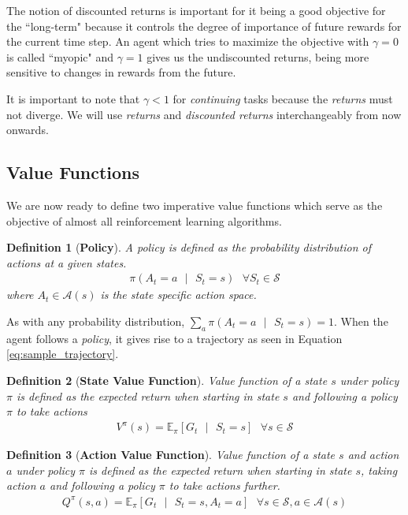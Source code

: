 \documentclass[12pt,a4paper]{article}
\newtheorem{definition}{Definition}
\begin{document}
The notion of discounted returns is important for it being a good objective for the ``long-term"
because it controls the degree of importance of future rewards for the current time step. An
agent which tries to maximize the objective with $\gamma = 0$ is called ``myopic" and
$\gamma = 1$ gives us the undiscounted returns, being more sensitive to changes in rewards
from the future.

It is important to note that $\gamma < 1$ for \textit{continuing} tasks because the \textit{returns}
must not diverge. We will use \textit{returns} and \textit{discounted returns} interchangeably
from now onwards.

\subsection{Value Functions}

We are now ready to define two imperative value functions which serve as the objective of 
almost all reinforcement learning algorithms.

\begin{definition}[\textbf{Policy}]
A policy is defined as the probability distribution of actions at a given states.
\begin{align}
\pi(A_t = a\text{ }|\text{ }S_t=s)\text{ }\forall S_t \in \mathcal{S}
\end{align}
where $A_t \in \mathcal{A}(s)$ is the state specific action space.
\end{definition}

As with any probability distribution, $\sum_{a} \pi(A_t = a\text{ }|\text{ }S_t=s) = 1$. When the
agent follows a \textit{policy}, it gives rise to a trajectory as seen in Equation 
\ref{eq:sample_trajectory}.

\begin{definition}[\textbf{State Value Function}]
Value function of a state $s$ under policy $\pi$ is defined as the expected return when starting
in state $s$ and following a policy $\pi$ to take actions
\begin{align}
V^\pi(s) = \mathbb{E}_\pi \left[ G_t\text{ }|\text{ }S_t=s \right]\text{ }\forall s \in \mathcal{S}
\end{align}
\end{definition}

\begin{definition}[\textbf{Action Value Function}]
Value function of a state $s$ and action $a$ under policy $\pi$ is defined as the expected return
when starting in state $s$, taking action $a$ and following a policy $\pi$ to take actions further.
\begin{align}
Q^\pi(s,a) = \mathbb{E}_\pi \left[ G_t\text{ }|\text{ }S_t=s, A_t=a \right]\text{ }\forall s \in \mathcal{S}, a \in \mathcal{A}(s)
\end{align}
\end{definition}
\end{document}
